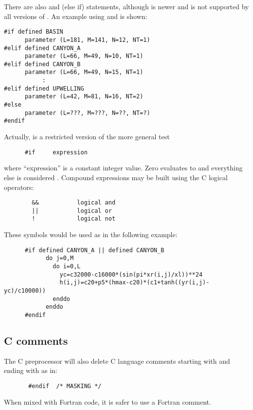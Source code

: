 There are also  and  (else if) statements,
although  is newer and is not supported by all versions of
.  An example using  and  is
shown:
\begin{verbatim}
#if defined BASIN
      parameter (L=181, M=141, N=12, NT=1)
#elif defined CANYON_A
      parameter (L=66, M=49, N=10, NT=1)
#elif defined CANYON_B
      parameter (L=66, M=49, N=15, NT=1)
           :
#elif defined UPWELLING
      parameter (L=42, M=81, N=16, NT=2)
#else
      parameter (L=???, M=???, N=??, NT=?)
#endif
\end{verbatim}

Actually,  is a restricted version of the more general
test
\begin{verbatim}
      #if     expression
\end{verbatim}
where ``expression'' is a constant integer value.  Zero evaluates
to  and everything else is considered .
Compound expressions may be built using the C logical operators:
\begin{verbatim}
        &&           logical and
        ||           logical or
        !            logical not
\end{verbatim}
These symbols would be used as in the following example:
\begin{verbatim}
      #if defined CANYON_A || defined CANYON_B
            do j=0,M
              do i=0,L
                yc=c32000-c16000*(sin(pi*xr(i,j)/xl))**24
                h(i,j)=c20+p5*(hmax-c20)*(c1+tanh((yr(i,j)-yc)/c10000))
              enddo
            enddo
      #endif
\end{verbatim}

\subsection{C comments}
The C preprocessor will also delete C language comments starting
with \code{/*} and ending with \code{*/} as in:
\begin{verbatim}
       #endif  /* MASKING */
\end{verbatim}
When mixed with Fortran code, it is safer to use a Fortran
comment.


